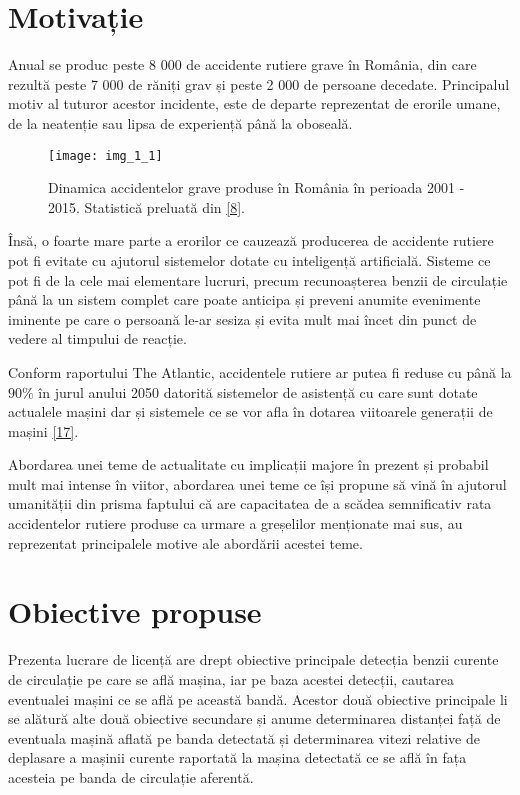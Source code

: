 \section{Motivație}

Anual se produc peste 8 000 de accidente rutiere grave în România, din care rezultă peste 7 000 de răniți grav și peste 2 000 de persoane decedate. Principalul motiv al tuturor acestor incidente, este de departe reprezentat de erorile umane, de la neatenție sau lipsa de experiență până la oboseală.
\begin{figure}[!h]
	\centering
	\texttt{[image: img\_1\_1]}
	\caption[Dinamica accidente rutiere]{Dinamica accidentelor grave produse în România în perioada 2001 - 2015. Statistică preluată din \hyperlink{Dinamicaaccidentelorrutiere}{[8]}.}
\end{figure} 

Însă, o foarte mare parte a erorilor ce cauzează producerea de accidente rutiere pot fi evitate cu ajutorul sistemelor dotate cu inteligență artificială. Sisteme ce pot fi de la cele mai elementare lucruri, precum recunoașterea benzii de circulație până la un sistem complet care poate anticipa și preveni anumite evenimente iminente pe care o persoană le-ar sesiza și evita mult mai încet din punct de vedere al timpului de reacție.

Conform raportului The Atlantic, accidentele rutiere ar putea fi reduse cu până la $90\%$ în jurul anului 2050 datorită sistemelor de asistență cu care sunt dotate actualele mașini dar și sistemele ce se vor afla în dotarea viitoarele generații de mașini \hyperlink{TheAtlantic}{[17]}.

Abordarea unei teme de actualitate cu implicații majore în prezent și probabil mult mai intense în viitor, abordarea unei teme ce își propune să vină în ajutorul umanității din prisma faptului că are capacitatea de a scădea semnificativ rata accidentelor rutiere produse ca urmare a greșelilor menționate mai sus, au reprezentat principalele motive ale abordării acestei teme.

\section{Obiective propuse}

Prezenta lucrare de licență are drept obiective principale detecția benzii curente de circulație pe care se află mașina, iar pe baza acestei detecții, cautarea eventualei mașini ce se află pe această bandă. 
Acestor două obiective principale li se alătură alte două obiective secundare și anume determinarea distanței față de eventuala mașină aflată pe banda detectată și determinarea vitezi relative de deplasare a mașinii curente raportată la mașina detectată ce se află în fața acesteia pe banda de circulație aferentă.

